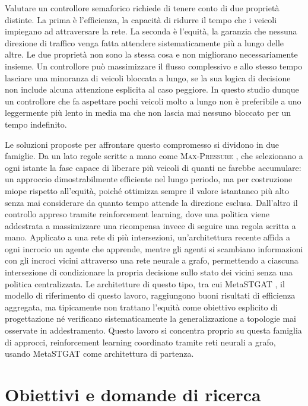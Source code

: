 Valutare un controllore semaforico richiede di tenere conto di due
proprietà distinte. La prima è l'efficienza, la capacità di ridurre il
tempo che i veicoli impiegano ad attraversare la rete. La seconda è
l'equità, la garanzia che nessuna direzione di traffico venga fatta
attendere sistematicamente più a lungo delle altre. Le due proprietà non sono la
stessa cosa e non migliorano necessariamente insieme. Un controllore può
massimizzare il flusso complessivo e allo stesso tempo lasciare una
minoranza di veicoli bloccata a lungo, se la sua logica di decisione non
include alcuna attenzione esplicita al caso peggiore. In questo studio
dunque un controllore che fa aspettare pochi veicoli molto a lungo non è
preferibile a uno leggermente più lento in media ma che non lascia mai
nessuno bloccato per un tempo indefinito.

Le soluzioni proposte per affrontare questo compromesso si dividono in due
famiglie. Da un lato regole scritte a mano come \textsc{Max-Pressure}
\citep{varaiya2013maxpressure}, che selezionano a ogni istante la fase
capace di liberare più veicoli di quanti ne farebbe accumulare: un
approccio dimostrabilmente efficiente nel lungo periodo, ma per
costruzione miope rispetto all'equità, poiché ottimizza sempre il valore
istantaneo più alto senza mai considerare da quanto tempo attende la
direzione esclusa. Dall'altro il controllo appreso tramite reinforcement
learning, dove una politica viene addestrata a massimizzare una
ricompensa invece di seguire una regola scritta a mano. Applicato a una
rete di più intersezioni, un'architettura recente affida a ogni incrocio
un agente che apprende, mentre gli agenti si scambiano informazioni con
gli incroci vicini attraverso una rete neurale a grafo, permettendo a
ciascuna intersezione di condizionare la propria decisione sullo stato
dei vicini senza una politica centralizzata. Le architetture di questo
tipo, tra cui MetaSTGAT \citep{wang2022metastgat}, il modello di
riferimento di questo lavoro, raggiungono buoni risultati di efficienza
aggregata, ma tipicamente non trattano l'equità come obiettivo esplicito
di progettazione né verificano sistematicamente la generalizzazione a
topologie mai osservate in addestramento. Questo lavoro si concentra
proprio su questa famiglia di approcci, reinforcement learning coordinato
tramite reti neurali a grafo, usando MetaSTGAT come architettura di
partenza.

\section{Obiettivi e domande di ricerca}

